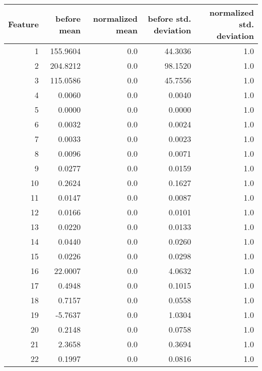 \begin{tabular}{rrrrr}
\toprule
 Feature &  before mean &  normalized mean &  before std. deviation &  normalized std. deviation \\
\midrule
       1 &     155.9604 &              0.0 &                44.3036 &                        1.0 \\
       2 &     204.8212 &              0.0 &                98.1520 &                        1.0 \\
       3 &     115.0586 &              0.0 &                45.7556 &                        1.0 \\
       4 &       0.0060 &              0.0 &                 0.0040 &                        1.0 \\
       5 &       0.0000 &              0.0 &                 0.0000 &                        1.0 \\
       6 &       0.0032 &              0.0 &                 0.0024 &                        1.0 \\
       7 &       0.0033 &              0.0 &                 0.0023 &                        1.0 \\
       8 &       0.0096 &              0.0 &                 0.0071 &                        1.0 \\
       9 &       0.0277 &              0.0 &                 0.0159 &                        1.0 \\
      10 &       0.2624 &              0.0 &                 0.1627 &                        1.0 \\
      11 &       0.0147 &              0.0 &                 0.0087 &                        1.0 \\
      12 &       0.0166 &              0.0 &                 0.0101 &                        1.0 \\
      13 &       0.0220 &              0.0 &                 0.0133 &                        1.0 \\
      14 &       0.0440 &              0.0 &                 0.0260 &                        1.0 \\
      15 &       0.0226 &              0.0 &                 0.0298 &                        1.0 \\
      16 &      22.0007 &              0.0 &                 4.0632 &                        1.0 \\
      17 &       0.4948 &              0.0 &                 0.1015 &                        1.0 \\
      18 &       0.7157 &              0.0 &                 0.0558 &                        1.0 \\
      19 &      -5.7637 &              0.0 &                 1.0304 &                        1.0 \\
      20 &       0.2148 &              0.0 &                 0.0758 &                        1.0 \\
      21 &       2.3658 &              0.0 &                 0.3694 &                        1.0 \\
      22 &       0.1997 &              0.0 &                 0.0816 &                        1.0 \\
\bottomrule
\end{tabular}
